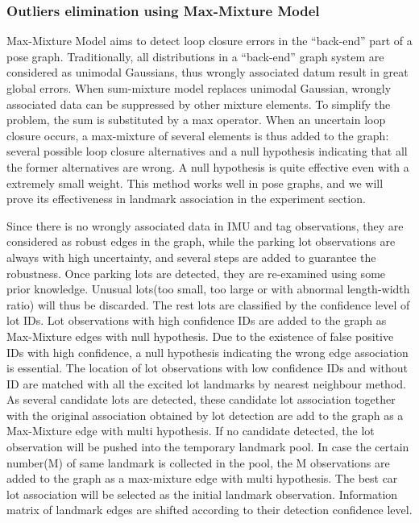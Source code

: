 \documentclass[journal]{IEEEtran}
\begin{document}
\subsubsection{Outliers elimination using Max-Mixture Model}
Max-Mixture Model \cite{Pfingsthorn2014Representing} aims to detect loop closure errors in the “back-end” part of a pose graph. 
Traditionally, all distributions in a “back-end” graph system are considered as unimodal Gaussians, thus wrongly associated datum result in great global errors. 
When sum-mixture model replaces unimodal Gaussian, wrongly associated data can be suppressed by other mixture elements. 
To simplify the problem, the sum is substituted by a max operator. 
When an uncertain loop closure occurs, a max-mixture of several elements is thus added to the graph: several possible loop closure alternatives and a null hypothesis indicating that all the former alternatives are wrong. 
A null hypothesis is quite effective even with a extremely small weight.\cite{Pfingsthorn2014Representing}  
This method works well in pose graphs\cite{Latif2014Robust}\cite{Sunderhauf2013Switchable}\cite{Cadena:2016fp}, and we will prove its effectiveness in landmark association in the experiment section.

Since there is no wrongly associated data in IMU and tag observations, they are considered as robust edges in the graph, while the parking lot observations are always with high uncertainty, and several steps are added to guarantee the robustness. 
Once parking lots are detected, they are re-examined using some prior knowledge. 
Unusual lots(too small, too large or with abnormal length-width ratio) will thus be discarded. 
The rest lots are classified by the confidence level of lot IDs. Lot observations with high confidence IDs are added to the graph as Max-Mixture edges with null hypothesis. 
Due to the existence of false positive IDs with high confidence, a null hypothesis indicating the wrong edge association is essential. 
The location of lot observations with low confidence IDs and without ID are matched with all the excited lot landmarks by nearest neighbour method. 
As several candidate lots are detected, these candidate lot association together with the original association obtained by lot detection are add to the graph as a Max-Mixture edge with multi hypothesis. 
If no candidate detected, the lot observation will be pushed into the temporary landmark pool. 
In case the certain number(M) of same landmark is collected in the pool, the M observations are added to the graph as a max-mixture edge with multi hypothesis. 
The best car lot association will be selected as the initial landmark observation. Information matrix of landmark edges are shifted according to their detection confidence level.
\end{document}
